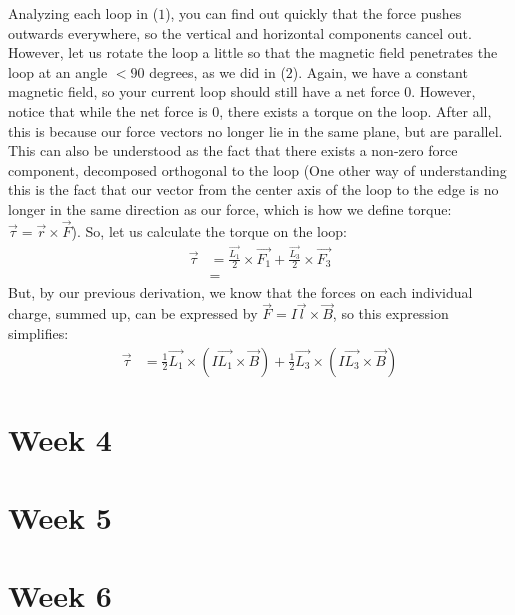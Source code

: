 \documentclass{article}
\begin{document}
Analyzing each loop in ($1$), you can find out quickly that the force pushes outwards everywhere, so the vertical and horizontal components cancel out. However, let us rotate the loop a little so that the magnetic field penetrates the loop at an angle $< 90$ degrees, as we did in ($2$). Again, we have a constant magnetic field, so your current loop should still have a net force $0$. However, notice that while the net force is $0$, there exists a torque on the loop. After all, this is because our force vectors no longer lie in the same plane, but are parallel. This can also be understood as the fact that there exists a non-zero force component, decomposed orthogonal to the loop (One other way of understanding this is the fact that our vector from the center axis of the loop to the edge is no longer in the same direction as our force, which is how we define torque: $\vec{\tau} = \vec{r}\times\vec{F}$). So, let us calculate the torque on the loop:
\begin{align*}
\vec{\tau} &= \frac{\vec{L_1}}{2}\times\vec{F_\text{1}} + \frac{\vec{L_3}}{2}\times\vec{F_\text{3}}\\
&= 
\end{align*}
But, by our previous derivation, we know that the forces on each individual charge, summed up, can be expressed by $\vec{F} = I\vec{l}\times\vec{B}$, so this expression simplifies:
\begin{align*}
\vec{\tau} &= \frac{1}{2}\vec{L_1}\times(I\vec{L_1}\times\vec{B}) + \frac{1}{2}\vec{L_3}\times (I\vec{L_3}\times\vec{B})
\end{align*}




\pagebreak

\section{Week 4}

\pagebreak

\section{Week 5}

\pagebreak

\section{Week 6}
\end{document}
